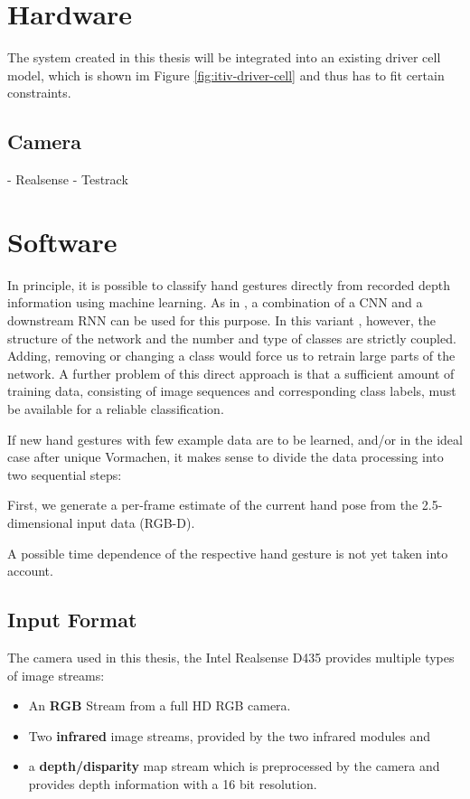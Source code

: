 
\section{Hardware}
The system created in this thesis will be integrated into an existing driver cell model, which is shown im Figure \ref{fig:itiv-driver-cell} and thus has to fit certain constraints.


\subsection{Camera}

- Realsense
- Testrack


\section{Software}
In principle, it is possible to classify hand gestures directly from recorded depth information using machine learning. As in \cite{Molchanov2016}, a combination of a CNN and a downstream RNN can be used for this purpose. In this variant , however, the structure of the network and the number and type of classes are strictly coupled. Adding, removing or changing a class would force us to retrain large parts of the network.
A further problem of this direct approach is that a sufficient amount of training data, consisting of image sequences and corresponding class labels, must be available for a reliable classification.

If new hand gestures with few example data are to be learned, and/or in the ideal case after unique Vormachen, it makes sense to divide the data processing into two sequential steps:

First, we generate a per-frame estimate of the current hand pose from the 2.5-dimensional input data (RGB-D). 


A possible time dependence of the respective hand gesture is not yet taken into account. 

\subsection{Input Format}
The camera used in this thesis, the Intel Realsense D435 provides multiple types of image streams:

\begin{itemize}
	\item An \textbf{RGB} Stream from a full HD RGB camera. 
	\item Two \textbf{infrared} image streams, provided by the two infrared modules and
	\item a \textbf{depth/disparity} map stream which is preprocessed by the camera and provides depth information with a 16 bit resolution.
\end{itemize}

